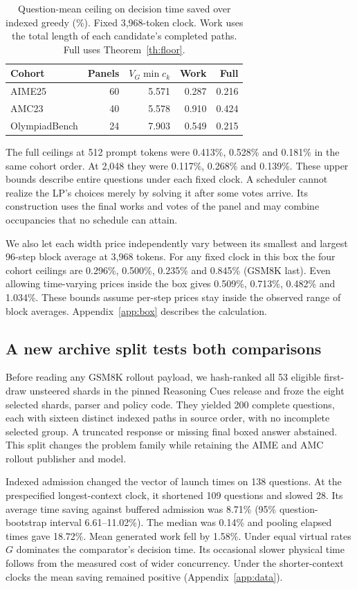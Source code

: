 \begin{table}[tb]\centering
\caption{Question-mean ceiling on decision time saved over indexed greedy (\%). Fixed 3,968-token clock. Work uses the total length of each candidate's completed paths. Full uses Theorem~\ref{th:floor}.}\label{tab:floor}
\small\setlength{\tabcolsep}{4pt}
\begin{tabular}{lrrrr}\toprule
Cohort & Panels & \(V_G\min c_k\) & Work & Full\\\midrule
AIME25 & 60 & 5.571 & 0.287 & 0.216\\
AMC23 & 40 & 5.578 & 0.910 & 0.424\\
OlympiadBench & 24 & 7.903 & 0.549 & 0.215\\\bottomrule
\end{tabular}
\end{table}
The full ceilings at 512 prompt tokens were 0.413\%, 0.528\% and 0.181\% in the same cohort order. At 2,048 they were 0.117\%, 0.268\% and 0.139\%. These upper bounds describe entire questions under each fixed clock. A scheduler cannot realize the LP's choices merely by solving it after some votes arrive. Its construction uses the final works and votes of the panel and may combine occupancies that no schedule can attain.

We also let each width price independently vary between its smallest and largest 96-step block average at 3,968 tokens. For any fixed clock in this box the four cohort ceilings are 0.296\%, 0.500\%, 0.235\% and 0.845\% (GSM8K last). Even allowing time-varying prices inside the box gives 0.509\%, 0.713\%, 0.482\% and 1.034\%. These bounds assume per-step prices stay inside the observed range of block averages. Appendix~\ref{app:box} describes the calculation.

\subsection{A new archive split tests both comparisons}
Before reading any GSM8K rollout payload, we hash-ranked all 53 eligible first-draw unsteered shards in the pinned Reasoning Cues release and froze the eight selected shards, parser and policy code. They yielded 200 complete questions, each with sixteen distinct indexed paths in source order, with no incomplete selected group. A truncated response or missing final boxed answer abstained. This split changes the problem family while retaining the AIME and AMC rollout publisher and model.

Indexed admission changed the vector of launch times on 138 questions. At the prespecified longest-context clock, it shortened 109 questions and slowed 28. Its average time saving against buffered admission was 8.71\% (95\% question-bootstrap interval 6.61--11.02\%). The median was 0.14\% and pooling elapsed times gave 18.72\%. Mean generated work fell by 1.58\%. Under equal virtual rates \(G\) dominates the comparator's decision time. Its occasional slower physical time follows from the measured cost of wider concurrency. Under the shorter-context clocks the mean saving remained positive (Appendix~\ref{app:data}).

